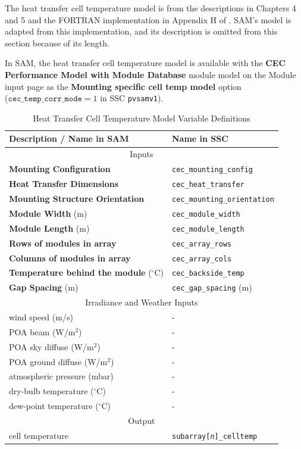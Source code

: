 \documentclass[12pt,letterpaper]{article}
\begin{document}
The heat transfer cell temperature model is from the descriptions in Chapters 4 and 5 and the FORTRAN implementation in Appendix H of \citet{neises2011}. SAM's model is adapted from this implementation, and its description is omitted from this section because of its length.

In SAM, the heat transfer cell temperature model is available with the \textbf{CEC Performance Model with Module Database} module model on the Module input page as the \textbf{Mounting specific cell temp model} option\\($\mathtt{cec\_temp\_corr\_mode}=1$ in SSC \texttt{pvsamv1}).

\begin{table}
\begin{center}
\caption{Heat Transfer Cell Temperature Model Variable Definitions}
\begin{tabular}{ll}
\midrule
Description / \textbf{Name in SAM} & Name in SSC \\
\midrule
\multicolumn{2}{c}{Inputs}\\
\textbf{Mounting Configuration} & \texttt{cec\_mounting\_config} \\ 
\textbf{Heat Transfer Dimensions} & \texttt{cec\_heat\_transfer} \\ 
\textbf{Mounting Structure Orientation} & \texttt{cec\_mounting\_orientation} \\ 
\textbf{Module Width} (m)& \texttt{cec\_module\_width} \\ 
\textbf{Module Length} (m)& \texttt{cec\_module\_length} \\ 
\textbf{Rows of modules in array} & \texttt{cec\_array\_rows} \\ 
\textbf{Columns of modules in array} & \texttt{cec\_array\_cols} \\ 
\textbf{Temperature behind the module} ($^\circ$C) & \texttt{cec\_backside\_temp} \\ 
\textbf{Gap Spacing} (m)& \texttt{cec\_gap\_spacing} (m) \\ 
\multicolumn{2}{c}{Irradiance and Weather Inputs}\\
wind speed (m/s)&-\\
POA beam (W/m$^2$)&-\\
POA sky diffuse (W/m$^2$)&-\\
POA ground diffuse (W/m$^2$)&-\\
atmospheric pressure (mbar)&-\\
dry-bulb temperature ($^\circ$C)&-\\
dew-point temperature ($^\circ$C)&-\\
\midrule
\multicolumn{2}{c}{Output}\\
cell temperature & \texttt{subarray[\textit{n}]\_celltemp} \\
\hline
\end{tabular}
\label{tab-tempheattransfer}
\end{center}
\end{table}
\end{document}
